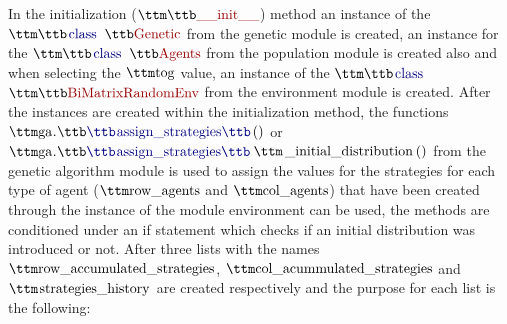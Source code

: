 
In the initialization ($\pythoninline{\_\_init\_\_}$) method an instance of the $\pythoninline{class Genetic}$ from the genetic module is created, an instance for the $\pythoninline{class Agents}$ from the population module is created also and when selecting the $\pythoninline{tog}$ value, an instance of the $\pythoninline{class}$ $\pythoninline{BiMatrixRandomEnv}$ from the environment module is created. After the instances are created within the initialization method, the functions $\pythoninline{ga.assign\_strategies()}$ or $\pythoninline{ga.assign\_strategies}$$\pythoninline{\_initial\_distribution()}$ from the genetic algorithm module is used to assign the values for the strategies for each type of agent ($\pythoninline{row\_agents}$ and $\pythoninline{col\_agents}$) that have been created through the instance of the module environment can be used, the methods are conditioned under an if statement which checks if an initial distribution was introduced or not. After three lists with the names $\pythoninline{row\_accumulated\_strategies}$, $\pythoninline{col\_acummulated\_strategies}$ and $\pythoninline{strategies\_history}$ are created respectively and the purpose for each list is the following:

